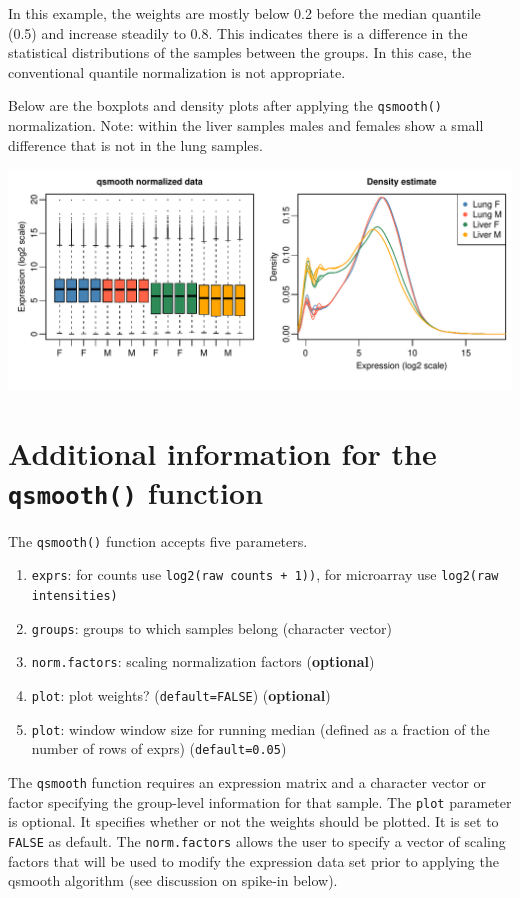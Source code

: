 \documentclass{article}\usepackage[]{graphicx}\usepackage[usenames,dvipsnames]{color}
\makeatletter
\def\maxwidth{ %
  \ifdim\Gin@nat@width>\linewidth
    \linewidth
  \else
    \Gin@nat@width
  \fi
}
\newenvironment{knitrout}{}{} %
\makeatother
\begin{document}
In this example, the weights are mostly below 0.2 before the median quantile
(0.5) and increase steadily to 0.8. This indicates there is a difference 
in the statistical distributions of the samples between the groups. 
In this case, the conventional quantile normalization is not appropriate. 

Below are the boxplots and density plots after applying the \texttt{qsmooth()} 
normalization. Note: within the liver samples males and females show a 
small difference that is not in the lung samples.

\begin{knitrout}
\color{fgcolor}

{\centering \includegraphics[width=\maxwidth]{figure/norm_data12-1} 

}



\end{knitrout}

\section{Additional information for the \texttt{qsmooth()} function}
The \texttt{qsmooth()} function accepts five parameters.
\begin{enumerate}
\item \texttt{exprs}: for counts use \texttt{log2(raw counts + 1))}, 
for microarray use \texttt{log2(raw intensities)}
\item \texttt{groups}: groups to which samples belong (character vector)
\item \texttt{norm.factors}: scaling normalization factors ({\bf optional})
\item \texttt{plot}: plot weights? (\texttt{default=FALSE}) ({\bf optional})
\item \texttt{plot}: window window size for running median 
(defined as a fraction of the number of rows of exprs) (\texttt{default=0.05})
\end{enumerate}
The \texttt{qsmooth} function requires an expression matrix and a 
character vector or factor specifying the group-level information for that 
sample. The \texttt{plot} parameter is optional. It specifies whether or
not the weights should be plotted. It is set to \texttt{FALSE} as default. 
The \texttt{norm.factors} allows the user to specify a 
vector of scaling factors that will be used to modify the 
expression data set prior to applying the qsmooth algorithm 
(see discussion on spike-in below).
\end{document}
